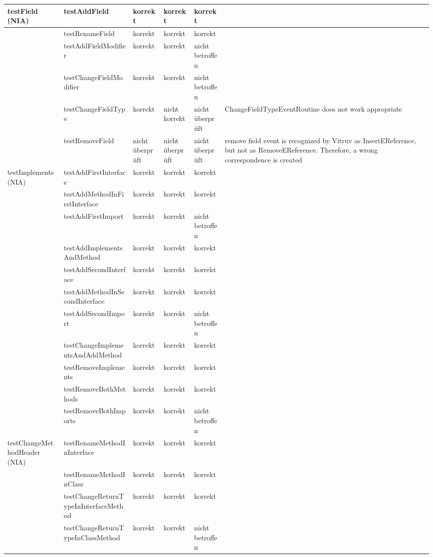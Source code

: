 \begin{tiny}
\begin{longtable}[c]{|p{2.2cm}|p{3.5cm}|p{1cm}|p{1cm}|p{1cm}|p{4cm}|}
testField 			(NIA) & testAddField & korrekt & korrekt & korrekt &  \\ \hline
 & testRenameField & korrekt & korrekt & korrekt &  \\ \hline
 & testAddFieldModifier & korrekt & korrekt & nicht betroffen \\ \hline
 & testChangeFieldModifier & korrekt & korrekt & nicht betroffen &  \\ \hline
 & testChangeFieldType & korrekt & nicht korrekt & nicht überprüft & ChangeFieldTypeEventRoutine does not work appropriate \\ \hline
 & testRemoveField & nicht überprüft & nicht überprüft & nicht überprüft & remove field event is recognized by Vitruv as InsertEReference, but not as RemoveEReference. Therefore, a wrong correspondence is created \\ \hline
testImplements 			(NIA) & testAddFirstInterface & korrekt & korrekt & korrekt &  \\ \hline
 & testAddMethodInFirstInterface & korrekt & korrekt & korrekt &  \\ \hline
 & testAddFirstImport & korrekt & korrekt & nicht 			betroffen &  \\ \hline
 & testAddImplementsAndMethod & korrekt & korrekt & korrekt &  \\ \hline
 & testAddSecondInterface & korrekt & korrekt & korrekt &  \\ \hline
 & testAddMethodInSecondInterface & korrekt & korrekt & korrekt &  \\ \hline
 & testAddSecondImport & korrekt & korrekt & nicht 			betroffen &  \\ \hline
 & testChangeImplementsAndAddMethod & korrekt & korrekt & korrekt &  \\ \hline
 & testRemoveImplements & korrekt & korrekt & korrekt &  \\ \hline
 & testRemoveBothMethods & korrekt & korrekt & korrekt &  \\ \hline
 & testRemoveBothImports & korrekt & korrekt & nicht 			betroffen &  \\ \hline
testChangeMethodHeader 			(NIA) & testRenameMethodInInterface & korrekt & korrekt & korrekt &  \\ \hline
 & testRenameMethodInClass & korrekt & korrekt & korrekt &  \\ \hline
 & testChangeReturnTypeInInterfaceMethod & korrekt & korrekt & korrekt &  \\ \hline
 & testChangeReturnTypeInClassMethod & korrekt & korrekt & nicht 			betroffen &  \\ \hline

\end{longtable}
\end{tiny}

